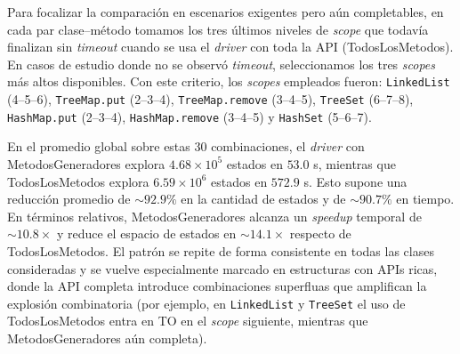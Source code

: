 


Para focalizar la comparación en escenarios exigentes pero aún completables,
en cada par clase–método tomamos los tres últimos niveles de \emph{scope}
que todavía finalizan sin \emph{timeout} cuando se usa el \emph{driver} con toda
la API (\textsf{TodosLosMetodos}). En casos de estudio donde no se observó \emph{timeout},
seleccionamos los tres \emph{scopes} más altos disponibles. Con este criterio,
los \emph{scopes} empleados fueron: \texttt{LinkedList} (4–5–6),
\texttt{TreeMap.put} (2–3–4), \texttt{TreeMap.remove} (3–4–5),
\texttt{TreeSet} (6–7–8), \texttt{HashMap.put} (2–3–4),
\texttt{HashMap.remove} (3–4–5) y \texttt{HashSet} (5–6–7).

En el promedio global sobre estas 30 combinaciones, el \emph{driver} con
\textsf{MetodosGeneradores} explora \(4.68\times 10^5\) estados en \(53.0\) s, mientras que
\textsf{TodosLosMetodos} explora \(6.59\times 10^6\) estados en \(572.9\) s. Esto supone
una reducción promedio de \(\sim 92.9\%\) en la cantidad de estados y de
\(\sim 90.7\%\) en tiempo. En términos relativos, \textsf{MetodosGeneradores} alcanza un
\emph{speedup} temporal de \(\sim 10.8\times\) y reduce el espacio de estados en
\(\sim 14.1\times\) respecto de \textsf{TodosLosMetodos}. El patrón se repite de forma
consistente en todas las clases consideradas y se vuelve especialmente marcado en
estructuras con APIs ricas, donde la API completa introduce combinaciones
superfluas que amplifican la explosión combinatoria (por ejemplo, en
\texttt{LinkedList} y \texttt{TreeSet} el uso de \textsf{TodosLosMetodos} entra en TO en
el \emph{scope} siguiente, mientras que \textsf{MetodosGeneradores} aún completa).

